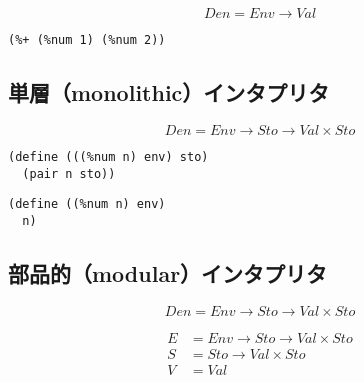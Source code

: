 \documentclass[11pt, oneside]{jsarticle}   	%
\begin{document}
$$
Den = Env \rightarrow Val
$$

\newpage

\newpage



\newpage

\newpage




\begin{lstlisting}
(%+ (%num 1) (%num 2))
\end{lstlisting}

\subsection{単層（monolithic）インタプリタ}

$$
Den = Env \rightarrow Sto \rightarrow Val \times Sto
$$

\begin{lstlisting}
(define (((%num n) env) sto)
  (pair n sto))
\end{lstlisting}

\begin{lstlisting}
(define ((%num n) env)
  n)
\end{lstlisting}

\subsection{部品的（modular）インタプリタ}

$$
Den = Env \rightarrow Sto \rightarrow Val \times Sto
$$

$$
\begin{aligned}
E &= Env \rightarrow Sto \rightarrow Val \times Sto \\
S &= Sto \rightarrow Val \times Sto \\
V &= Val \\
\end{aligned}
$$
\newpage

\newpage

\newpage
\end{document}
